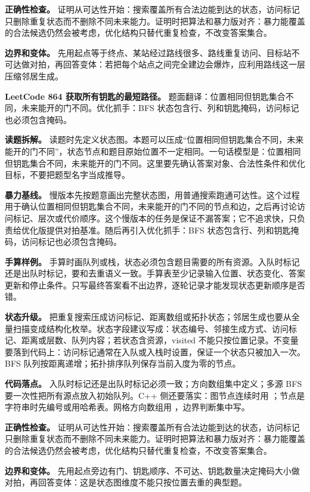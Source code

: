 \textbf{正确性检查。} 证明从可达性开始：搜索覆盖所有合法边能到达的状态，访问标记只删除重复状态而不删除不同未来能力。证明时把算法和暴力版对齐：暴力能覆盖的合法候选仍然会被考虑，优化结构只替代重复检查，不改变答案集合。

\textbf{边界和变体。} 先用起点等于终点、某站经过路线很多、路线重复访问、目标站不可达做对拍，再回答变体：若把每个站点之间完全建边会爆炸，应利用路线这一层压缩邻居生成。

\noindent\textbf{LeetCode 864 获取所有钥匙的最短路径。} 题面翻译：位置相同但钥匙集合不同，未来能开的门不同。优化抓手：BFS 状态包含行、列和钥匙掩码，访问标记也必须包含掩码。

\textbf{读题拆解。} 读题时先定义状态图。本题可以压成“位置相同但钥匙集合不同，未来能开的门不同”，状态节点和题目原始位置不一定相同。一句话模型是：位置相同但钥匙集合不同，未来能开的门不同。这里要先确认答案对象、合法性条件和优化目标，不要把题型名字当成推导。

\textbf{暴力基线。} 慢版本先按题意画出完整状态图，用普通搜索跑通可达性。这个过程用于确认位置相同但钥匙集合不同，未来能开的门不同的节点和边，之后再讨论访问标记、层次或代价顺序。这个慢版本的任务是保证不漏答案；它不追求快，只负责给优化版提供对拍基准。随后再引入优化抓手：BFS 状态包含行、列和钥匙掩码，访问标记也必须包含掩码。

\textbf{手算样例。} 手算时画队列或栈，状态必须包含题目需要的所有资源。入队时标记还是出队时标记，要和去重语义一致。手算表至少记录输入位置、状态变化、答案更新和停止条件。只写最终答案看不出边界，逐轮记录才能发现状态更新顺序是否错。

\textbf{状态升级。} 把重复搜索压成访问标记、距离数组或拓扑状态；邻居生成也要从全量扫描变成结构化枚举。状态字段建议写成：状态编号、邻接生成方式、访问标记、距离或层数、队列内容；若状态含资源，visited 不能只按位置记录。不变量要落到代码上：访问标记通常在入队或入栈时设置，保证一个状态只被加入一次。BFS 队列按距离递增；拓扑排序队列保存当前入度为零的节点。

\textbf{代码落点。} 入队时标记还是出队时标记必须一致；方向数组集中定义；多源 BFS 要一次性把所有源点放入初始队列。C++ 侧还要落实：图节点连续时用 ；节点是字符串时先编号或用哈希表。网格方向数组用 ，边界判断集中写。

\textbf{正确性检查。} 证明从可达性开始：搜索覆盖所有合法边能到达的状态，访问标记只删除重复状态而不删除不同未来能力。证明时把算法和暴力版对齐：暴力能覆盖的合法候选仍然会被考虑，优化结构只替代重复检查，不改变答案集合。

\textbf{边界和变体。} 先用起点旁边有门、钥匙顺序、不可达、钥匙数量决定掩码大小做对拍，再回答变体：这是状态图维度不能只按位置去重的典型题。

